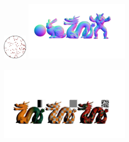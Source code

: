     \includegraphics[width=0.090\textwidth]{images/Dataset/syn_test/MERL_directions}
    \hfill
    \includegraphics[width=0.390\textwidth]{images/Dataset/syn_test/synth_test_data.pdf}
\\
    \vspace{-0.3em}
    \\
    \includegraphics[width=0.49\textwidth]{images/Results/Synth_Test/SVBRDF/SVBRDF_Dragon.pdf}
     \\
